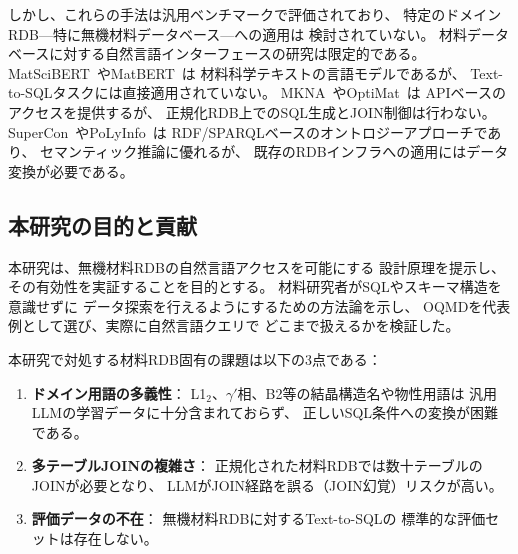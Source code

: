 \documentclass[5p,twocolumn]{elsarticle}
\begin{document}
しかし、これらの手法は汎用ベンチマークで評価されており、
特定のドメインRDB---特に無機材料データベース---への適用は
検討されていない。
材料データベースに対する自然言語インターフェースの研究は限定的である。
MatSciBERT~\cite{gupta2022matscibert}やMatBERT~\cite{walker2021matbert}は
材料科学テキストの言語モデルであるが、
Text-to-SQLタスクには直接適用されていない。
MKNA~\cite{zhuang2026mkna}やOptiMat~\cite{hu2026optimat}は
APIベースのアクセスを提供するが、
正規化RDB上でのSQL生成とJOIN制御は行わない。
SuperCon~\cite{ishii2023supercon}やPoLyInfo~\cite{ishii2024polyinfo}は
RDF/SPARQLベースのオントロジーアプローチであり、
セマンティック推論に優れるが、
既存のRDBインフラへの適用にはデータ変換が必要である。

\subsection{本研究の目的と貢献}

本研究は、無機材料RDBの自然言語アクセスを可能にする
設計原理を提示し、その有効性を実証することを目的とする。
材料研究者がSQLやスキーマ構造を意識せずに
データ探索を行えるようにするための方法論を示し、
OQMDを代表例として選び、実際に自然言語クエリで
どこまで扱えるかを検証した。

本研究で対処する材料RDB固有の課題は以下の3点である：
\begin{enumerate}
  \item \textbf{ドメイン用語の多義性}：
    L1$_2$、$\gamma'$相、B2等の結晶構造名や物性用語は
    汎用LLMの学習データに十分含まれておらず、
    正しいSQL条件への変換が困難である。
  \item \textbf{多テーブルJOINの複雑さ}：
    正規化された材料RDBでは数十テーブルのJOINが必要となり、
    LLMがJOIN経路を誤る（JOIN幻覚）リスクが高い。
  \item \textbf{評価データの不在}：
    無機材料RDBに対するText-to-SQLの
    標準的な評価セットは存在しない。
\end{enumerate}
\end{document}
